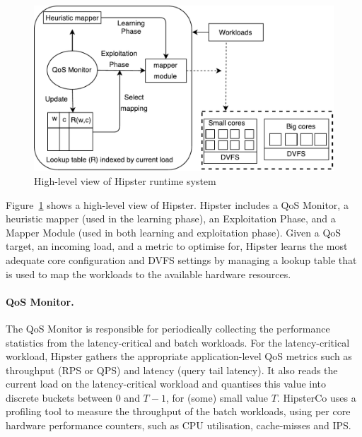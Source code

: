 \begin{figure}[htbp]
    \centering
    \includegraphics[scale=0.6]{Chapter4/Figs/RIL-Vinson-nocloud-new.pdf}
    \caption{High-level view of Hipster runtime system} 
    \label{fig:hipsteroverview}
\end{figure}

Figure~\ref{fig:hipsteroverview} shows a high-level view of Hipster. Hipster includes a
QoS Monitor, a heuristic mapper (used in the learning phase), an Exploitation Phase, and a
Mapper Module (used in both learning and exploitation phase). Given a QoS target, an
incoming load, and a metric to optimise for, Hipster learns the most adequate core
configuration and DVFS settings by managing a lookup table that is used to map the
workloads to the available hardware resources.

\paragraph*{QoS Monitor.} The QoS Monitor is responsible for periodically collecting the
performance statistics from the latency-critical and batch workloads. For the
latency-critical workload, Hipster gathers the appropriate application-level QoS
metrics such as throughput (RPS or QPS) and latency (query tail latency). It also reads
the current load on the latency-critical workload and quantises this value into discrete
buckets between 0 and $T-1$, for (some) small value $T$. HipsterCo uses a profiling tool
to measure the throughput of the batch workloads, using per core hardware performance
counters, such as CPU utilisation, cache-misses and IPS.

